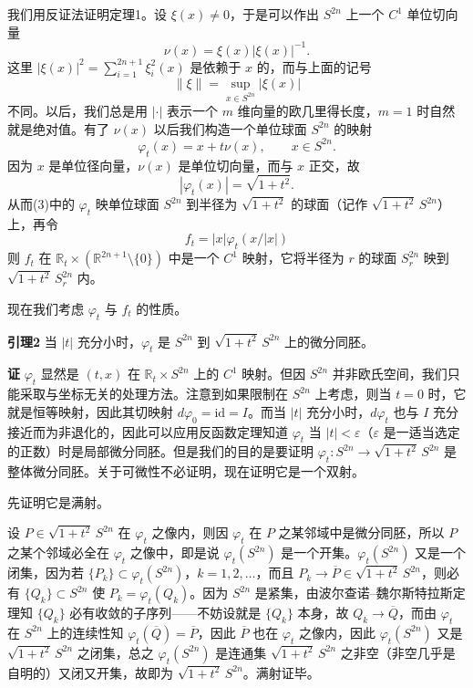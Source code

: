 我们用反证法证明定理1。设 $\xi(x)\ne0$，于是可以作出 $S^{2n}$ 上一个 $C^1$ 单位切向量
\[
 \nu(x)=\xi(x)|\xi(x)|^{-1}.
\]
这里 $|\xi(x)|^2=\sum_{i=1}^{2n+1}\xi_i^2(x)$ 是依赖于 $x$ 的，而与上面的记号\[\|\xi\|=\sup_{x\in S^{2n}}|\xi(x)|\]不同。以后，我们总是用 $|\cdot|$ 表示一个 $m$ 维向量的欧几里得长度，$m=1$ 时自然就是绝对值。有了 $\nu(x)$ 以后我们构造一个单位球面 $S^{2n}$ 的映射
\begin{equation}
 \varphi_t(x)=x+t\nu(x),\qquad x\in S^{2n}.
 \tag{3}
\end{equation}
因为 $x$ 是单位径向量，$\nu(x)$ 是单位切向量，而与 $x$ 正交，故
\[
 |\varphi_t(x)|=\sqrt{1+t^2}.
\]
从而(3)中的 $\varphi_t$ 映单位球面 $S^{2n}$ 到半径为 $\sqrt{1+t^2}$ 的球面（记作 $\sqrt{1+t^2}\,S^{2n}$）上，再令
\begin{equation}
 f_t=|x|\varphi_t(x/|x|)
 \tag{4}
\end{equation}
则 $f_t$ 在 $\mathbb R_t\times(\mathbb R^{2n+1}\setminus\{0\})$ 中是一个 $C^1$ 映射，它将半径为 $r$ 的球面 $S_r^{2n}$ 映到 $\sqrt{1+t^2}\,S_r^{2n}$ 内。

现在我们考虑 $\varphi_t$ 与 $f_t$ 的性质。

\noindent\textbf{引理2}\quad
当 $|t|$ 充分小时，$\varphi_t$ 是 $S^{2n}$ 到 $\sqrt{1+t^2}\,S^{2n}$ 上的微分同胚。

\noindent\textbf{证}\quad
$\varphi_t$ 显然是 $(t,x)$ 在 $\mathbb R_t\times S^{2n}$ 上的 $C^1$ 映射。但因 $S^{2n}$ 并非欧氏空间，我们只能采取与坐标无关的处理方法。注意到如果限制在 $S^{2n}$ 上考虑，则当 $t=0$ 时，它就是恒等映射，因此其切映射 $d\varphi_0=\mathrm{id}=I$。而当 $|t|$ 充分小时，$d\varphi_t$ 也与 $I$ 充分接近而为非退化的，因此可以应用反函数定理知道 $\varphi_t$ 当 $|t|<\varepsilon$（$\varepsilon$ 是一适当选定的正数）时是局部微分同胚。但是我们的目的是要证明 $\varphi_t:S^{2n}\to\sqrt{1+t^2}\,S^{2n}$ 是整体微分同胚。关于可微性不必证明，现在证明它是一个双射。

先证明它是满射。

设 $P\in\sqrt{1+t^2}\,S^{2n}$ 在 $\varphi_t$ 之像内，则因 $\varphi_t$ 在 $P$ 之某邻域中是微分同胚，所以 $P$ 之某个邻域必全在 $\varphi_t$ 之像中，即是说 $\varphi_t(S^{2n})$ 是一个开集。$\varphi_t(S^{2n})$ 又是一个闭集，因为若 $\{P_k\}\subset\varphi_t(S^{2n})$，$k=1,2,\ldots$，而且 $P_k\to\overline P\in\sqrt{1+t^2}\,S^{2n}$，则必有 $\{Q_k\}\subset S^{2n}$ 使 $P_k=\varphi_t(Q_k)$。因为 $S^{2n}$ 是紧集，由波尔查诺--魏尔斯特拉斯定理知 $\{Q_k\}$ 必有收敛的子序列——不妨设就是 $\{Q_k\}$ 本身，故 $Q_k\to\overline Q$，而由 $\varphi_t$ 在 $S^{2n}$ 上的连续性知 $\varphi_t(\overline Q)=\overline P$，因此 $\overline P$ 也在 $\varphi_t$ 之像内，因此 $\varphi_t(S^{2n})$ 又是 $\sqrt{1+t^2}\,S^{2n}$ 之闭集，总之 $\varphi_t(S^{2n})$ 是连通集 $\sqrt{1+t^2}\,S^{2n}$ 之非空（非空几乎是自明的）又闭又开集，故即为 $\sqrt{1+t^2}\,S^{2n}$。满射证毕。

